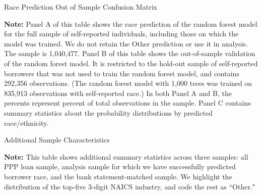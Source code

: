 \documentclass[11pt]{article}
\begin{document}
\newpage
\begin{table}[H]
	\caption{Race Prediction Out of Sample Confusion Matrix} \label{confusion_mat}
	\begin{center}
		
	\end{center}
	\begin{center}
		
	\end{center}
		\begin{center}
		
	\end{center}
	\begin{minipage}{\textwidth} \medskip
		\footnotesize{{\bf Note: }Panel A of this table shows the race prediction of the random forest model for the full sample of self-reported individuals, including those on which the model was trained. We do not retain the Other prediction or use it in analysis. The sample is 1,040,477. Panel B of this table shows the out-of-sample validation of the random forest model. It is restricted to the hold-out sample of self-reported borrowers that was not used to train the random forest model, and contains 292,356 observations. (The random forest model with 1,000 trees was trained on 835,913 observations with self-reported race.) In both Panel A and B, the percents represent percent of total observations in the sample. Panel C contains summary statistics about the probability distributions by predicted race/ethnicity.}
	\end{minipage}
\end{table}


\newpage
\begin{table}[H]
	\caption{Additional Sample Characteristics}
	\begin{adjustbox}{width=0.8\linewidth, center} \label{sample_comp_appendix}
		
	\end{adjustbox}

	\begin{minipage}{\textwidth} \medskip
		\footnotesize{{\bf Note: }This table shows additional summary statistics across three samples: all PPP loan sample, analysis sample for which we have successfully predicted borrower race, and the bank statement-matched sample. We highlight the distribution of the top-five 3-digit NAICS industry, and code the rest as ``Other."}
	\end{minipage}
\end{table}
\end{document}
